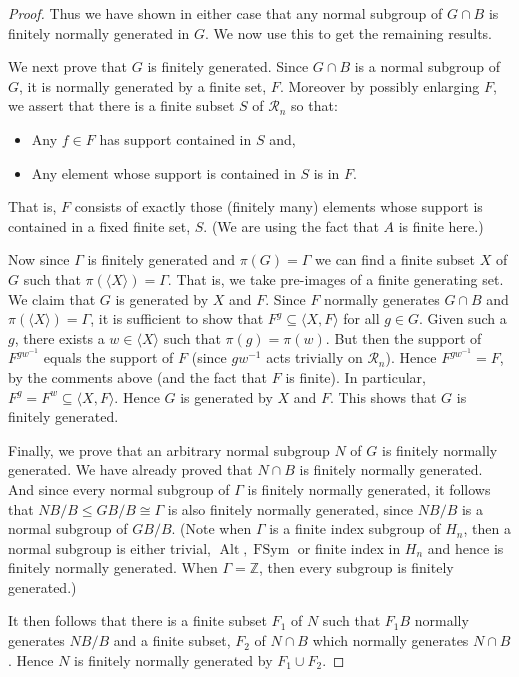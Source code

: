 \documentclass[11pt,a4paper]{amsart}
\theoremstyle{definition}
\theoremstyle{remark}
\newcommand{\FSym}{\operatorname{FSym}}
\newcommand{\Alt}{\operatorname{Alt}}
\newcommand{\Z}{\mathbb Z}
\newcommand{\Ra}{\mathcal{R}}
\begin{document}
\begin{proof}
\medspace

Thus we have shown in either case that any normal subgroup of $G \cap B$ is finitely normally generated in $G$. We now use this to get the remaining results. 


\medspace

We next prove that $G$ is finitely generated. Since $G \cap B$ is a normal subgroup of $G$, it is normally generated by a finite set, $F$. Moreover by possibly enlarging $F$, we assert that there is a finite subset $S$ of $\Ra_n$ so that:
\begin{itemize}
	\item Any $f \in F$ has support contained in $S$ and, 
	\item Any element whose support is contained in $S$ is in $F$. 
\end{itemize}
That is, $F$ consists of exactly those (finitely many) elements whose support is contained in a fixed finite set, $S$. (We are using the fact that $A$ is finite here.)

Now since $\Gamma$ is finitely generated and $\pi(G)= \Gamma$ we can find a finite subset $X$ of $G$ such that $\pi(\langle X \rangle) = \Gamma$. That is, we take pre-images of a finite generating set. We claim that $G$ is generated by $X$ and $F$. Since $F$ normally generates $G \cap B$ and $\pi(\langle X \rangle) = \Gamma$, it is sufficient to show that $F^g \subseteq \langle X, F \rangle$ for all $g \in G$. Given such a $g$, there exists a $w \in \langle X \rangle$ such that $\pi(g)=\pi(w)$. But then the support of $F^{g w^{-1}}$ equals the support of $F$ (since $g w^{-1}$ acts trivially on $\Ra_n$). Hence $F^{g w^{-1}}  = F$, by the comments above (and the fact that $F$ is finite). In particular, $F^g = F^w \subseteq \langle X, F \rangle$. Hence $G$ is generated by $X$ and $F$. This shows that $G$ is finitely generated. 

\medspace

Finally, we prove that an arbitrary normal subgroup $N$ of $G$ is finitely normally generated. We have already proved that $N \cap B$ is finitely normally generated. And since every normal subgroup of $\Gamma$ is finitely normally generated, it follows that $NB/B \leq GB/B \cong \Gamma$ is also finitely normally generated, since $NB/B$ is a normal subgroup of $GB/B$. (Note when $\Gamma$ is a finite index subgroup of $H_n$, then a normal subgroup is either trivial, $\Alt, \FSym$ or finite index in $H_n$ and hence is finitely normally generated. When $\Gamma=\Z$, then every subgroup is finitely generated.)

It then follows that there is a finite subset $F_1$ of $N$ such that $F_1B$ normally generates $NB/B$ and a finite subset, $F_2$ of $N \cap B$ which normally generates $N \cap B$. Hence $N$ is finitely normally generated by $F_1 \cup F_2$. 
\end{proof}
\end{document}
